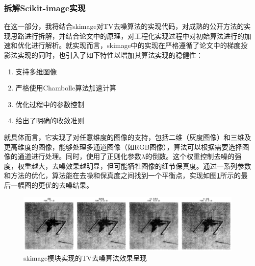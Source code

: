 \documentclass[UTF8]{ctexart}
\begin{document}
\subsubsection{拆解Scikit-image实现}
在这一部分，我将结合skimage对TV去噪算法的实现代码，对成熟的公开方法的实现思路进行拆解，并结合论文中的原理，对工程化实现过程中对初始算法进行的加速和优化进行解析。就实现而言，skimage中的实现在严格遵循了论文中的梯度投影法实现的同时，也引入了如下特性以增加其算法实现的稳健性：
\begin{enumerate}
  \item 支持多维图像
  \item 严格使用Chambolle算法加速计算
  \item 优化过程中的参数控制
  \item 给出了明确的收敛准则
\end{enumerate}
就具体而言，它实现了对任意维度的图像的支持，包括二维（灰度图像）和三维及更高维度的图像，能够处理多通道图像（如RGB图像），算法可以根据需要选择图像的通道进行处理。同时，使用了正则化参数$\lambda$的倒数。这个权重控制去噪的强度，权重越大，去噪效果越明显，但可能牺牲图像的细节保真度。通过一系列参数和方法的优化，算法能在去噪和保真度之间找到一个平衡点，实现如图\ref{fig:tvwithskimage}所示的最后一幅图的更优的去噪结果。
\begin{figure}[H]
  \centering
  \includegraphics[width=\textwidth]{./images/tvwithskimage.png} 
  \caption{skimage模块实现的TV去噪算法效果呈现}
  \label{fig:tvwithskimage}
\end{figure}
\end{document}
